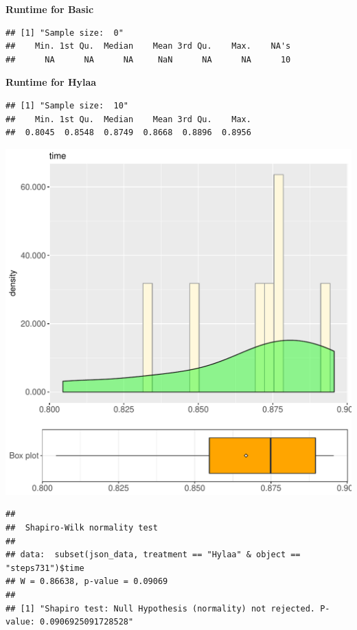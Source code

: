 \documentclass{article}\usepackage[]{graphicx}\usepackage[]{color}
\makeatletter
\def\maxwidth{ %
  \ifdim\Gin@nat@width>\linewidth
    \linewidth
  \else
    \Gin@nat@width
  \fi
}
\newenvironment{kframe}{%
 \def\at@end@of@kframe{}%
 \ifinner\ifhmode%
  \def\at@end@of@kframe{\end{minipage}}%
  \begin{minipage}{\columnwidth}%
 \fi\fi%
 \def\FrameCommand##1{\hskip\@totalleftmargin \hskip-\fboxsep
 \colorbox{shadecolor}{##1}\hskip-\fboxsep
     \hskip-\linewidth \hskip-\@totalleftmargin \hskip\columnwidth}%
 \MakeFramed {\advance\hsize-\width
   \@totalleftmargin\z@ \linewidth\hsize
   \@setminipage}}%
 {\par\unskip\endMakeFramed%
 \at@end@of@kframe}
\newenvironment{knitrout}{}{} %
\makeatother
\begin{document}
 \textbf{Runtime for Basic}
\begin{knitrout}
\color{fgcolor}\begin{kframe}
\begin{verbatim}
## [1] "Sample size:  0"
##    Min. 1st Qu.  Median    Mean 3rd Qu.    Max.    NA's 
##      NA      NA      NA     NaN      NA      NA      10
\end{verbatim}
\end{kframe}
\end{knitrout}
 \textbf{Runtime for Hylaa}
\begin{knitrout}
\color{fgcolor}\begin{kframe}
\begin{verbatim}
## [1] "Sample size:  10"
##    Min. 1st Qu.  Median    Mean 3rd Qu.    Max. 
##  0.8045  0.8548  0.8749  0.8668  0.8896  0.8956
\end{verbatim}
\end{kframe}
\includegraphics[width=\maxwidth]{figure/RH3_Hylaa_steps731-1} 
\begin{kframe}\begin{verbatim}
## 
## 	Shapiro-Wilk normality test
## 
## data:  subset(json_data, treatment == "Hylaa" & object == "steps731")$time
## W = 0.86638, p-value = 0.09069
## 
## [1] "Shapiro test: Null Hypothesis (normality) not rejected. P-value: 0.0906925091728528"
\end{verbatim}
\end{kframe}
\end{knitrout}
  
\end{document}
